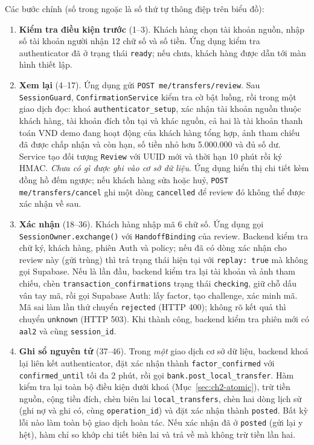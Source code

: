 Các bước chính (số trong ngoặc là số thứ tự thông điệp trên biểu đồ):
\begin{enumerate}
  \item \textbf{Kiểm tra điều kiện trước} (1--3). Khách hàng chọn tài khoản nguồn, nhập số tài khoản người nhận 12 chữ số và số tiền. Ứng dụng kiểm tra authenticator đã ở trạng thái \texttt{ready}; nếu chưa, khách hàng được dẫn tới màn hình thiết lập.
  \item \textbf{Xem lại} (4--17). Ứng dụng gửi \texttt{POST me/\allowbreak{}transfers/\allowbreak{}review}. Sau \texttt{SessionGuard}, \texttt{Confirmation\allowbreak{}Service} kiểm tra cờ bật luồng, rồi trong một giao dịch đọc: khoá \texttt{authenticator\_\allowbreak{}setup}, xác nhận tài khoản nguồn thuộc khách hàng, tài khoản đích tồn tại và khác nguồn, cả hai là tài khoản thanh toán VND demo đang hoạt động của khách hàng tổng hợp, ảnh tham chiếu đã được chấp nhận và còn hạn, số tiền nhỏ hơn 5.000.000 và đủ số dư. Service tạo đối tượng \texttt{Review} với UUID mới và thời hạn 10 phút rồi ký HMAC. \emph{Chưa có gì được ghi vào cơ sở dữ liệu}. Ứng dụng hiển thị chi tiết kèm đồng hồ đếm ngược; nếu khách hàng sửa hoặc huỷ, \texttt{POST me/\allowbreak{}transfers/\allowbreak{}cancel} ghi một dòng \texttt{cancelled} để review đó không thể được xác nhận về sau.
  \item \textbf{Xác nhận} (18--36). Khách hàng nhập mã 6 chữ số. Ứng dụng gọi \texttt{SessionOwner.\allowbreak{}exchange()} với \texttt{Handoff\allowbreak{}Binding} của review. Backend kiểm tra chữ ký, khách hàng, phiên Auth và policy; nếu đã có dòng xác nhận cho review này (gửi trùng) thì trả trạng thái hiện tại với \texttt{replay: true} mà không gọi Supabase. Nếu là lần đầu, backend kiểm tra lại tài khoản và ảnh tham chiếu, chèn \texttt{transaction\_\allowbreak{}confirmations} trạng thái \texttt{checking}, giữ chỗ dấu vân tay mã, rồi gọi Supabase Auth: lấy factor, tạo challenge, xác minh mã. Mã sai làm lần thử chuyển \texttt{rejected} (HTTP 400); không rõ kết quả thì chuyển \texttt{unknown} (HTTP 503). Khi thành công, backend kiểm tra phiên mới có \texttt{aal2} và cùng \texttt{session\_\allowbreak{}id}.
  \item \textbf{Ghi sổ nguyên tử} (37--46). Trong \emph{một} giao dịch cơ sở dữ liệu, backend khoá lại liên kết authenticator, đặt xác nhận thành \texttt{factor\_\allowbreak{}confirmed} với \texttt{confirmed\_\allowbreak{}until} tối đa 2 phút, rồi gọi \texttt{bank.\allowbreak{}post\_\allowbreak{}local\_\allowbreak{}transfer}. Hàm kiểm tra lại toàn bộ điều kiện dưới khoá (Mục~\ref{sec:ch2-atomic}), trừ tiền nguồn, cộng tiền đích, chèn biên lai \texttt{local\_\allowbreak{}transfers}, chèn hai dòng lịch sử (ghi nợ và ghi có, cùng \texttt{operation\_\allowbreak{}id}) và đặt xác nhận thành \texttt{posted}. Bất kỳ lỗi nào làm toàn bộ giao dịch hoàn tác. Nếu xác nhận đã ở \texttt{posted} (gửi lại y hệt), hàm chỉ so khớp chi tiết biên lai và trả về mà không trừ tiền lần hai.

\end{enumerate}
